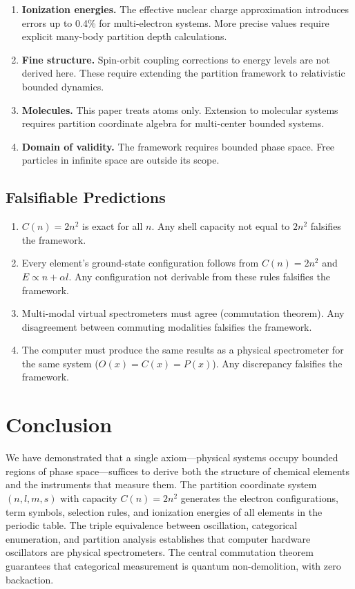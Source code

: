 \documentclass[11pt,a4paper]{article}
\theoremstyle{definition}
\theoremstyle{remark}
\begin{document}
\begin{enumerate}
\item \textbf{Ionization energies.} The effective nuclear charge approximation introduces errors up to 0.4\% for multi-electron systems. More precise values require explicit many-body partition depth calculations.
\item \textbf{Fine structure.} Spin-orbit coupling corrections to energy levels are not derived here. These require extending the partition framework to relativistic bounded dynamics.
\item \textbf{Molecules.} This paper treats atoms only. Extension to molecular systems requires partition coordinate algebra for multi-center bounded systems.
\item \textbf{Domain of validity.} The framework requires bounded phase space. Free particles in infinite space are outside its scope.
\end{enumerate}

\subsection{Falsifiable Predictions}

\begin{enumerate}
\item $C(n) = 2n^2$ is exact for all $n$. Any shell capacity not equal to $2n^2$ falsifies the framework.
\item Every element's ground-state configuration follows from $C(n) = 2n^2$ and $E \propto n + \alpha l$. Any configuration not derivable from these rules falsifies the framework.
\item Multi-modal virtual spectrometers must agree (commutation theorem). Any disagreement between commuting modalities falsifies the framework.
\item The computer must produce the same results as a physical spectrometer for the same system ($O(x) = C(x) = P(x)$). Any discrepancy falsifies the framework.
\end{enumerate}

\section{Conclusion}
\label{sec:conclusion}

We have demonstrated that a single axiom---physical systems occupy bounded regions of phase space---suffices to derive both the structure of chemical elements and the instruments that measure them. The partition coordinate system $(n, l, m, s)$ with capacity $C(n) = 2n^2$ generates the electron configurations, term symbols, selection rules, and ionization energies of all elements in the periodic table. The triple equivalence between oscillation, categorical enumeration, and partition analysis establishes that computer hardware oscillators are physical spectrometers. The central commutation theorem guarantees that categorical measurement is quantum non-demolition, with zero backaction.
\end{document}

